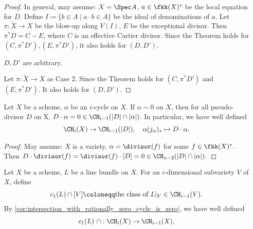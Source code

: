 \begin{proof}
    In general, may assume: $X = \Spec A$, $a \in \fkk(X)^*$ be the local equation for $D$.
    Define $I \coloneqq \{b \in A \mid a \cdot b \in A\}$ be the ideal of denominations of $a$.
    Let $\pi: \tilde{X} \to X$ be the blow-up along $V(I)$, $E$ be the exceptional divisor.
    Then $\pi^* D = C - E$, where $C$ is an effective Cartier divisor.
    Since the Theorem holds for $(C , \pi^* D'), (E, \pi^* D')$, it also holds for $(D,D')$.

    \begin{case}
      $D,D'$ are arbitrary.
    \end{case}

    Let $\pi:\tilde{X} \to X$ as Case 2.
    Since the Theorem holds for $(C, \pi^*D')$ and $(E,\pi^*D')$.
    It also holds for $(D,D')$.
  \end{proof}


  \begin{corollary}\label{cor:intersection_with_rationally_zero_cycle_is_zero}
    Let $X$ be a scheme, $\alpha$ be an $i$-cycle on $X$.
    If $\alpha \sim 0$ on $X$, then for all pseudo-divisor $D$ on X, $D \cdot \alpha = 0 \in \CH_{i-1}(|D| \cap |\alpha|)$.
    In particular, we have well defined 
    \[ \CH_i (X) \to \CH_{i-1} (|D|),\quad \alpha (j_\alpha)_* \mapsto D \cdot \alpha. \]
  \end{corollary}
  \begin{proof}
    \Yang{}
    May assume: $X$ is a variety, $\alpha = \divisor(f)$ for some $f \in \fkk(X)^*$. 
    Then 
    $ D \cdot \divisor(f) = \divisor(f) \cdot [D] = 0 \in \CH_{n-2}(|D| \cap |\alpha|). $
  \end{proof}

  \begin{definition}
    Let $X$ be a scheme, $L$ be a line bundle on $X$.
    For an $i$-dimensional subvariety $V$ of $X$, define 
    \[ c_1(L) \cap [V] \coloneqq \text{the class of } L|_V \in \CH_{i-1}(V). \]
    By \cref{cor:intersection_with_rationally_zero_cycle_is_zero}, we have well defined 
    \[ c_1(L)\ \cap : \CH_i(X) \to \CH_{i-1} (X). \]
  \end{definition}